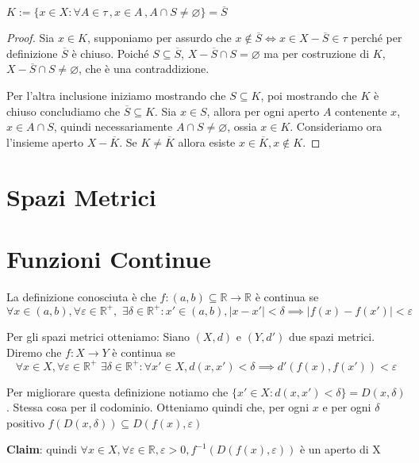 \begin{proposition}
    \(K := \{x \in X : \forall A \in \tau\,,x \in A\,, A \cap S \neq \varnothing\}
    = \overline{S}\) 
\end{proposition}
\begin{proof}
    Sia \(x \in  K\), supponiamo per assurdo che \(x \not\in \overline{S} \iff x \in
X - \overline{S} \in \tau\) perché per definizione \(\overline{S}\) è chiuso.
Poiché \(S \subseteq \overline{S}\),  \(X - \overline{S} \cap S = \varnothing\) ma per
costruzione di \(K\),  \(X - \overline{S} \cap  S \neq \varnothing\), che è una
contraddizione.

    Per l'altra inclusione iniziamo mostrando che \(S \subseteq  K\), poi mostrando che
    \(K\) è chiuso concludiamo che \(\overline{S} \subseteq  K\). Sia \(x \in
    S\), allora per ogni aperto \(A\) contenente \(x\), \(x \in A \cap  S\),
    quindi necessariamente \(A \cap  S \neq \varnothing\), ossia \(x \in K\).
    Consideriamo ora l'insieme aperto \(X - \overline{K}\). Se \(K \neq
    \overline{K}\) allora esiste \(x \in \overline{K}, x \not\in K\).
\end{proof}
\section{Spazi Metrici}

\section{Funzioni Continue}
La definizione conosciuta è che \(f: (a, b) \subseteq \mathbb{R} \to  \mathbb{R}\) è continua se
\[\forall x \in (a, b), \forall \varepsilon \in  \mathbb{R}^{+},\,\, \exists \delta
    \in  \mathbb{R}^{+}: x' \in  (a, b), |x - x'| < \delta \implies  |f(x) - f(x')| <
\varepsilon\]

Per gli spazi metrici otteniamo:
Siano \((X, d)\) e \((Y, d')\) due spazi metrici. Diremo che \(f: X \to  Y\)
è continua se \[\forall x \in  X, \forall \varepsilon \in \mathbb{R}^{+}\,\,
\exists \delta \in \mathbb{R}^{+}: \forall x' \in
X, d(x, x') < \delta \implies  d'(f(x), f(x')) < \varepsilon\]

Per migliorare questa definizione notiamo che \(\{x' \in  X : d(x, x') <
\delta\} = D(x, \delta)\). Stessa cosa per il codominio. Otteniamo quindi che,
per ogni \(x\)  e per ogni \(\delta\) positivo \(f(D(x, \delta)) \subseteq
D(f(x), \varepsilon)\) 

\textbf{Claim}: quindi \(\forall x \in X, \forall \varepsilon \in \mathbb{R},
\varepsilon > 0, f^{-1}(D(f(x), \varepsilon))\) è un aperto di X

